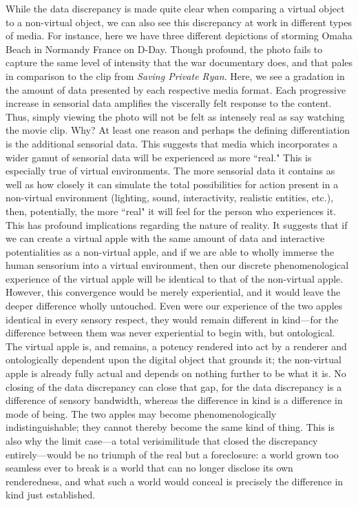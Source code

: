 \documentclass{article}
\begin{document}
While the data discrepancy is made quite clear when comparing a virtual object to a non-virtual object, we can also see this discrepancy at work in different types of media. For instance, here we have three different depictions of storming Omaha Beach in Normandy France on D-Day. Though profound, the photo fails to capture the same level of intensity that the war documentary does, and that pales in comparison to the clip from \textit{Saving Private Ryan}. Here, we see a gradation in the amount of data presented by each respective media format. Each progressive increase in sensorial data amplifies the viscerally felt response to the content. Thus, simply viewing the photo will not be felt as intensely real as say watching the movie clip. Why? At least one reason and perhaps the defining differentiation is the additional sensorial data. This suggests that media which incorporates a wider gamut of sensorial data will be experienced as more “real." This is especially true of virtual environments. The more sensorial data it contains as well as how closely it can simulate the total possibilities for action present in a non-virtual environment (lighting, sound, interactivity, realistic entities, etc.), then, potentially, the more “real" it will feel for the person who experiences it. This has profound implications regarding the nature of reality. It suggests that if we can create a virtual apple with the same amount of data and interactive potentialities as a non-virtual apple, and if we are able to wholly immerse the human sensorium into a virtual environment, then our discrete phenomenological experience of the virtual apple will be identical to that of the non-virtual apple. However, this convergence would be merely experiential, and it would leave the deeper difference wholly untouched. Even were our experience of the two apples identical in every sensory respect, they would remain different in kind—for the difference between them was never experiential to begin with, but ontological. The virtual apple is, and remains, a potency rendered into act by a renderer and ontologically dependent upon the digital object that grounds it; the non-virtual apple is already fully actual and depends on nothing further to be what it is. No closing of the data discrepancy can close that gap, for the data discrepancy is a difference of sensory bandwidth, whereas the difference in kind is a difference in mode of being. The two apples may become phenomenologically indistinguishable; they cannot thereby become the same kind of thing. This is also why the limit case—a total verisimilitude that closed the discrepancy entirely—would be no triumph of the real but a foreclosure: a world grown too seamless ever to break is a world that can no longer disclose its own renderedness, and what such a world would conceal is precisely the difference in kind just established.
\end{document}
